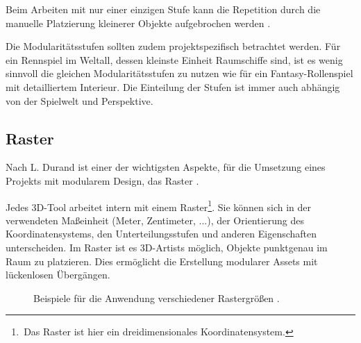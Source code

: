 \par
Beim Arbeiten mit nur einer einzigen Stufe kann die Repetition durch die manuelle Platzierung kleinerer Objekte aufgebrochen werden \parencite{Perry}.
\par
Die Modularitätsstufen sollten zudem projektspezifisch betrachtet werden. Für ein Rennspiel im Weltall, dessen kleinste Einheit Raumschiffe sind, ist es wenig sinnvoll die gleichen Modularitätsstufen zu nutzen wie für ein Fantasy-Rollenspiel mit detailliertem Interieur. Die Einteilung der Stufen ist immer auch abhängig von der Spielwelt und Perspektive.
\enlargethispage{10.5pt}
\subsection{Raster}\label{Rasterkapitel}
Nach L. Durand ist einer der wichtigsten Aspekte, für die Umsetzung eines Projekts mit modularem Design, das Raster \parencite{ForHonor}.
\par
Jedes 3D-Tool arbeitet intern mit einem Raster\footnote{\,Das Raster ist hier ein dreidimensionales Koordinatensystem.}. Sie können sich in der verwendeten Maßeinheit (Meter, Zentimeter, ...), der Orientierung des Koordinatensystems, den Unterteilungsstufen und anderen Eigenschaften unterscheiden. Im Raster ist es 3D-Artists möglich, Objekte punktgenau im Raum zu platzieren. Dies ermöglicht die Erstellung modularer Assets mit lückenlosen Übergängen. \parencite{Mader}
\begin{figure}[!h]
\label{RasterBilder}
\centering
  \qquad
  \caption{Beispiele für die Anwendung verschiedener Rastergrößen \parencite{Mader}.}%
\end{figure}
